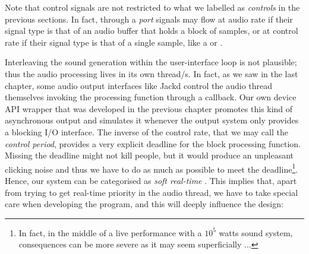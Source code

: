 Note that control signals are not restricted to what we labelled as
\emph{controls} in the previous sections. In fact, through a
\emph{port} signals may flow at audio rate if their signal type is
that of an audio buffer that holds a block of samples, or at control
rate if their signal type is that of a single sample, like a
 or .

Interleaving the sound generation within the user-interface loop is
not plausible; thus the audio processing lives in its own thread/s. In
fact, as we saw in the last chapter, some audio output interfaces like
Jackd control the audio thread themselves invoking the processing
function through a callback. Our own device API wrapper that was
developed in the previous chapter promotes this kind of asynchronous
output and simulates it whenever the output system only provides a
blocking I/O interface. The inverse of the control rate, that we may
call the \emph{control period}, provides a very explicit deadline for
the block processing function. Missing the deadline might not kill
people, but it would produce an unpleasant clicking noise and thus we
have to do as much as possible to meet the deadline\footnote{In fact,
  in the middle of a live performance with a $10^5$ watts sound
  system, consequences can be more severe as it may seem superficially
  ...}. Hence, our system can be categorised as \emph{soft real-time}
\cite{tanenbaum07mos}. This implies that, apart from trying to get
real-time priority in the audio thread, we have to take special care
when developing the program, and this will deeply influence the
design:


